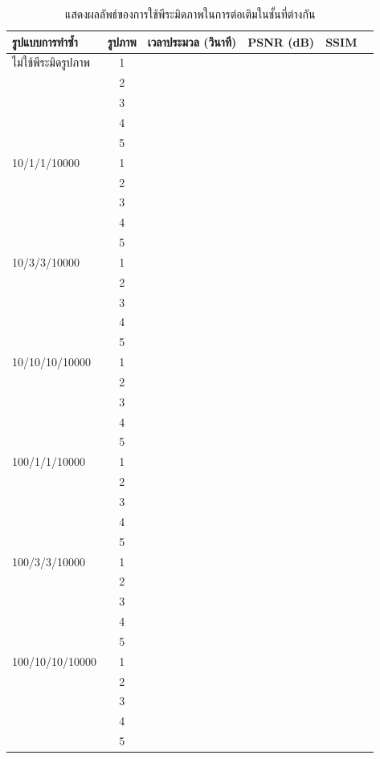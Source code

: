 \documentclass[hidelinks, a4paper,12pt]{article}
\numberwithin{equation}{section}							%
\numberwithin{equation}{section}
\begin{document}
{	\begin{table}[H]
		\centering
		\begin{tabular}[ht]{|l|c|c|c|c|c|}
			\hline
			รูปแบบการทำซ้ำ  & รูปภาพ &เวลาประมวล  (วินาที) & PSNR (dB) & SSIM \\
			\hline
			ไม่ใช้พีระมิดรูปภาพ & 1 &  &  & \\ 
			& 2 &  &  & \\
			& 3 &  &  & \\
			& 4 &  &  & \\
			& 5 &  &  & \\
			\hline
			10/1/1/10000 & 1 &  & & \\
			& 2 &  & & \\
			& 3 &  & & \\
			& 4 &  & & \\
			& 5 &  & & \\
			\hline
			10/3/3/10000  & 1 &  & & \\
			& 2 &  & & \\
			& 3 &  & & \\
			& 4 &  & & \\
			& 5 &  & & \\
			\hline
			10/10/10/10000  & 1 &  & & \\
			& 2 &  & & \\
			& 3 &  & & \\
			& 4 &  & & \\
			& 5 &  & & \\
			\hline
			100/1/1/10000  & 1 &  & & \\
			& 2 &  & & \\
			& 3 &  & & \\
			& 4 &  & & \\
			& 5 &  & & \\
			\hline
			100/3/3/10000  & 1 &  & & \\
			& 2 &  & & \\
			& 3 &  & & \\
			& 4 &  & & \\
			& 5 &  & & \\
			\hline
			100/10/10/10000  & 1 &  & & \\
			& 2 &  & & \\
			& 3 &  & & \\
			& 4 &  & & \\
			& 5 &  & & \\
			\hline
		\end{tabular}
		\caption{แสดงผลลัพธ์ของการใช้พีระมิดภาพในการต่อเติมในชั้นที่ต่างกัน}
\end{table}	
	
}
\end{document}
